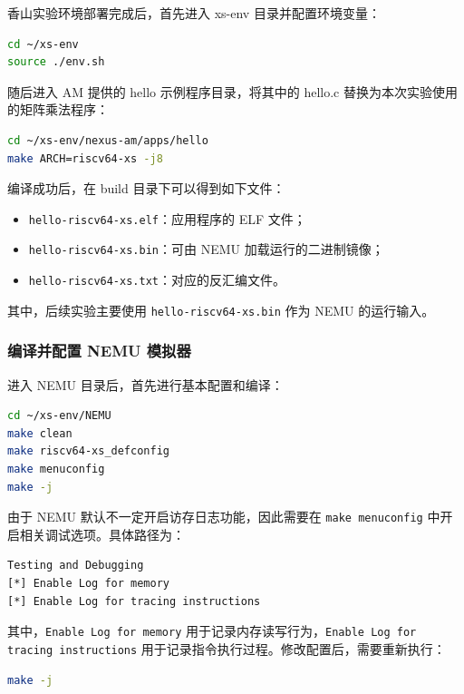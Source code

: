 香山实验环境部署完成后，首先进入 xs-env 目录并配置环境变量：

\begin{lstlisting}[language=bash]
cd ~/xs-env
source ./env.sh
\end{lstlisting}

随后进入 AM 提供的 hello 示例程序目录，将其中的 hello.c 替换为本次实验使用的矩阵乘法程序：

\begin{lstlisting}[language=bash]
cd ~/xs-env/nexus-am/apps/hello
make ARCH=riscv64-xs -j8
\end{lstlisting}

编译成功后，在 build 目录下可以得到如下文件：

\begin{itemize}
    \item \texttt{hello-riscv64-xs.elf}：应用程序的 ELF 文件；
    \item \texttt{hello-riscv64-xs.bin}：可由 NEMU 加载运行的二进制镜像；
    \item \texttt{hello-riscv64-xs.txt}：对应的反汇编文件。
\end{itemize}

其中，后续实验主要使用 \texttt{hello-riscv64-xs.bin} 作为 NEMU 的运行输入。

\subsubsection{编译并配置 NEMU 模拟器}

进入 NEMU 目录后，首先进行基本配置和编译：

\begin{lstlisting}[language=bash]
cd ~/xs-env/NEMU
make clean
make riscv64-xs_defconfig
make menuconfig
make -j
\end{lstlisting}

由于 NEMU 默认不一定开启访存日志功能，因此需要在 \texttt{make menuconfig} 中开启相关调试选项。具体路径为：

\begin{lstlisting}[language=bash]
Testing and Debugging
[*] Enable Log for memory
[*] Enable Log for tracing instructions
\end{lstlisting}

其中，\texttt{Enable Log for memory} 用于记录内存读写行为，\texttt{Enable Log for tracing instructions} 用于记录指令执行过程。修改配置后，需要重新执行：

\begin{lstlisting}[language=bash]
make -j
\end{lstlisting}

